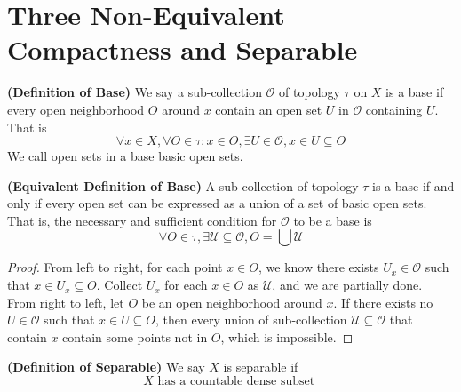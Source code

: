 \documentclass{report}
\begin{document}
\section{Three Non-Equivalent Compactness and Separable}
\begin{definition}
\label{0.3.1}
\textbf{(Definition of Base)} We say a sub-collection $\mathcal{O}$ of topology $\tau$ on $X$ is a base if every open neighborhood $O$ around $x$ contain an open set $U$ in $\mathcal{O}$ containing $U$. That is
\begin{equation}
\forall x\in X, \forall O\in\tau:x\in O,\exists U\in \mathcal{O}, x\in U\subseteq O
\end{equation}
We call open sets in a base basic open sets.
\end{definition}
\begin{theorem}
\label{0.3.2}
\textbf{(Equivalent Definition of Base)} A sub-collection of topology $\tau$ is a base if and only if every open set can be expressed as a union of a set of basic open sets. That is, the necessary and sufficient condition for $\mathcal{O}$ to be a base is 
\begin{equation}
\forall O\in \tau, \exists \mathcal{U}\subseteq \mathcal{O}, O=\bigcup \mathcal{U}
\end{equation}
\end{theorem}
\begin{proof}
  From left to right, for each point $x\in O$, we know there exists $U_x\in \mathcal{O}$ such that $x\in U_x\subseteq O$. Collect $U_x$ for each $x\in O$ as $\mathcal{U}$, and we are partially done.\\

  From right to left, let $O$ be an open neighborhood around $x$. If there exists no $U\in \mathcal{O}$ such that $x\in U\subseteq O$, then every union of sub-collection $\mathcal{U}\subseteq\mathcal{O}$ that contain $x$ contain some points not in  $O$, which is impossible.  
\end{proof}
\begin{definition}
\label{0.3.3}
\textbf{(Definition of Separable)} We say $X$ is separable if 
\begin{equation}
  X\text{ has a countable dense subset }
\end{equation}
\end{definition}
\end{document}
